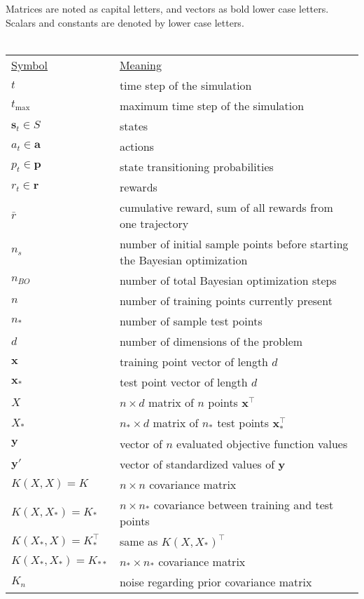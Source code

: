 Matrices are noted as capital letters, and vectors as bold lower case letters. Scalars and constants are denoted by lower case letters.\\
\\
\begin{tabular}{l l}
    \underline{Symbol} & \underline{Meaning}\\
    $t$ & time step of the simulation\\
    $t_\mathrm{max}$ & maximum time step of the simulation\\
    $\mathbf{s}_t \in S$ & states\\
    $a_t \in \mathbf{a}$ & actions\\
    $p_t \in \mathbf{p}$ & state transitioning probabilities\\
    $r_t \in \mathbf{r}$ & rewards\\
    $\bar{r}$ & cumulative reward, sum of all rewards from one trajectory\\
    $n_{s}$ & number of initial sample points before starting the Bayesian optimization\\
    $n_{BO}$ & number of total Bayesian optimization steps\\
    $n$ & number of training points currently present\\
    $n_*$ & number of sample test points\\
    $d$ & number of dimensions of the problem\\
    $\mathbf{x}$ & training point vector of length $d$\\
    $\mathbf{x_*}$ & test point vector of length $d$\\
    $X$ & $n \times d$ matrix of $n$ points $\mathbf{x}^{\top}$\\
    $X_*$ & $n_* \times d$ matrix of $n_*$ test points $\mathbf{x}^{\top}_*$\\
    $\mathbf{y}$ & vector of $n$ evaluated objective function values\\
    $\mathbf{y'}$ & vector of standardized values of $\mathbf{y}$\\
    $K(X,X) = K$ & $n \times n$ covariance matrix\\
    $K(X,X_*) = K_*$ & $n \times n_*$ covariance between training and test points\\
    $K(X_*,X) = K_*^\top$ & same as $K(X,X_*)^{\top}$\\
    $K(X_*,X_*) = K_{**}$ & $n_* \times n_*$ covariance matrix\\
    $K_n$ & noise regarding prior covariance matrix\\

\end{tabular}

